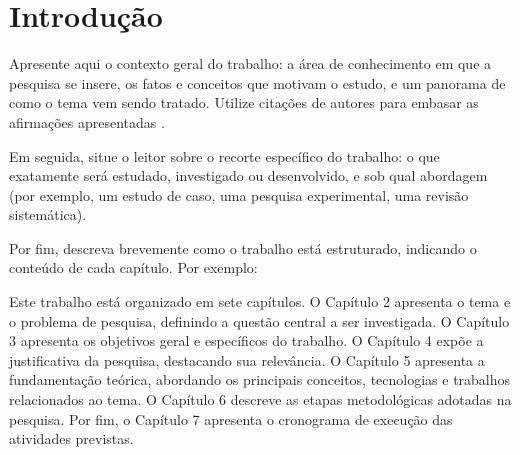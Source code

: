 \chapter{Introdução}

Apresente aqui o contexto geral do trabalho: a área de conhecimento em que a pesquisa se insere, os fatos e conceitos que motivam o estudo, e um panorama de como o tema vem sendo tratado. Utilize citações de autores para embasar as afirmações apresentadas \cite{marconi2017metodologia}.

Em seguida, situe o leitor sobre o recorte específico do trabalho: o que exatamente será estudado, investigado ou desenvolvido, e sob qual abordagem (por exemplo, um estudo de caso, uma pesquisa experimental, uma revisão sistemática).

Por fim, descreva brevemente como o trabalho está estruturado, indicando o conteúdo de cada capítulo. Por exemplo:

Este trabalho está organizado em sete capítulos. O Capítulo 2 apresenta o tema e o problema de pesquisa, definindo a questão central a ser investigada. O Capítulo 3 apresenta os objetivos geral e específicos do trabalho. O Capítulo 4 expõe a justificativa da pesquisa, destacando sua relevância. O Capítulo 5 apresenta a fundamentação teórica, abordando os principais conceitos, tecnologias e trabalhos relacionados ao tema. O Capítulo 6 descreve as etapas metodológicas adotadas na pesquisa. Por fim, o Capítulo 7 apresenta o cronograma de execução das atividades previstas.
